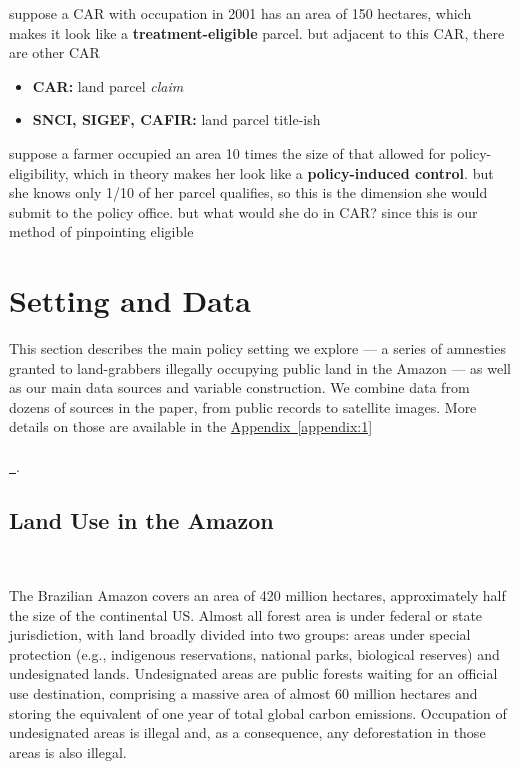 \documentclass[12pt]{article}
\newcommand*{\appendixref}[2][]{%
  \hyperref[{appendix:#2}]{%
    Appendix~\ref*{appendix:#2}%
    \ifx\\#1\\%
    \else
      \,#1%
    \fi
  }%
}
\begin{document}
suppose a CAR with occupation in 2001 has an area of 150 hectares, which makes it look like a \textbf{treatment-eligible} parcel. but adjacent to this CAR, there are other CAR

\begin{itemize}
    \item \textbf{CAR:} land parcel \textit{claim}
    \item \textbf{SNCI, SIGEF, CAFIR:} land parcel title-ish
\end{itemize}

suppose a farmer occupied an area 10 times the size of that allowed for policy-eligibility, which in theory makes her look like a \textbf{policy-induced control}. but she knows only 1/10 of her parcel qualifies, so this is the dimension she would submit to the policy office. but what would she do in CAR? since this is our method of pinpointing eligible 
\fi 
 

\clearpage

\section{Setting and Data}

This section describes the main policy setting we explore --- a series of amnesties granted to land-grabbers illegally occupying public land in the Amazon --- as well as our main data sources and variable construction. We combine data from dozens of sources in the paper, from public records to satellite images. More details on those are available in the \appendixref{1}.

\subsection{Land Use in the Amazon}
\ 

\quad The Brazilian Amazon covers an area of 420 million hectares, approximately half the size of the continental US. Almost all forest area is under federal or state jurisdiction, with land broadly divided into two groups: areas under special protection (e.g., indigenous reservations, national parks, biological reserves) and undesignated lands. Undesignated areas are public forests waiting for an official use destination, comprising a massive area of almost 60 million hectares and storing the equivalent of one year of total global carbon emissions. Occupation of undesignated areas is illegal and, as a consequence, any deforestation in those areas is also illegal. 
\ 
\end{document}
